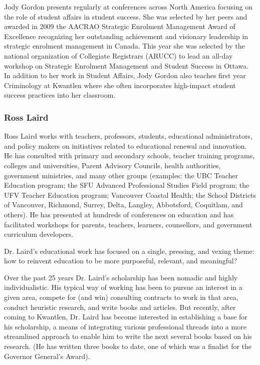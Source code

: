 \documentclass[letterpaper,10pt,headsepline]{scrreprt}
\begin{document}
  Jody Gordon presents regularly at conferences across North America focusing
  on the role of student affairs in student success. She was selected by her
  peers and awarded in 2009 the AACRAO Strategic Enrolment Management Award of
  Excellence recognizing her outstanding achievement and visionary leadership
  in strategic enrolment management in Canada. This year she was selected by
  the national organization of Collegiate Registrars (ARUCC) to lead an
  all-day workshop on Strategic Enrolment Management and Student Success in
  Ottawa. In addition to her work in Student Affairs, Jody Gordon also
  teaches first year Criminology at Kwantlen where she often incorporates
  high-impact student success practices into her classroom.

  \subsubsection{Ross Laird}

  Ross Laird works with teachers, professors, students, educational
  administrators, and policy makers on initiatives related to educational
  renewal and innovation. He has consulted with primary and secondary schools,
  teacher training programs, colleges and universities, Parent Advisory
  Councils, health authorities, government ministries, and many other groups
  (examples: the UBC Teacher Education program; the SFU Advanced Professional
  Studies Field program; the UFV Teacher Education program; Vancouver Coastal
  Health; the School Districts of Vancouver, Richmond, Surrey, Delta, Langley,
  Abbotsford, Coquitlam, and others). He has presented at hundreds of
  conferences on education and has facilitated workshops for parents,
  teachers, learners, counsellors, and government curriculum developers.

  Dr. Laird's educational work has focused on a single, pressing, and vexing
  theme: how to reinvent education to be more purposeful, relevant, and
  meaningful?

  Over the past 25 years Dr. Laird's scholarship has been nomadic and highly
  individualistic. His typical way of working has been to pursue an interest
  in a given area, compete for (and win) consulting contracts to work in that
  area, conduct heuristic research, and write books and articles. But
  recently, after coming to Kwantlen, Dr. Laird has become interested in
  establishing a base for his scholarship, a means of integrating various
  professional threads into a more streamlined approach to enable him to write
  the next several books based on his research. (He has written three books to
  date, one of which was a finalist for the Governor General's Award).
\end{document}
